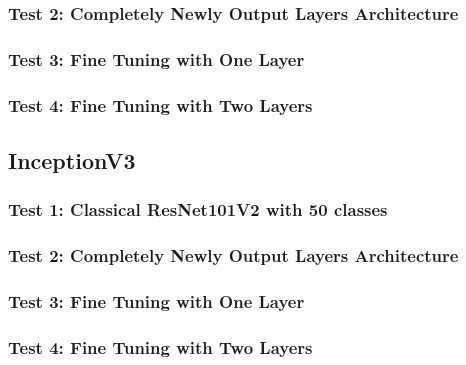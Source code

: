 \subsubsection{Test 2: Completely Newly Output Layers Architecture}

\subsubsection{Test 3: Fine Tuning with One Layer}

\subsubsection{Test 4: Fine Tuning with Two Layers}







\subsection{InceptionV3}

\subsubsection{Test 1: Classical ResNet101V2 with 50 classes}

\subsubsection{Test 2: Completely Newly Output Layers Architecture}

\subsubsection{Test 3: Fine Tuning with One Layer}

\subsubsection{Test 4: Fine Tuning with Two Layers}
